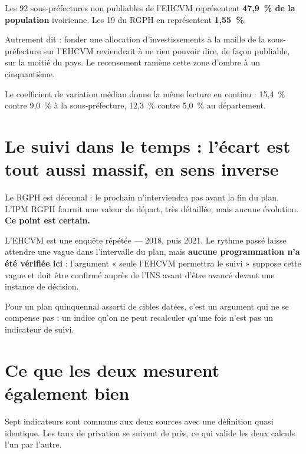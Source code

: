 \documentclass[11pt,a4paper]{article}
\begin{document}
\begin{attention}
Les 92 sous-préfectures non publiables de l'EHCVM représentent \textbf{47,9~\% de la population}
ivoirienne. Les 19 du RGPH en représentent \textbf{1,55~\%}.

Autrement dit : fonder une allocation d'investissements à la maille de la sous-préfecture sur
l'EHCVM reviendrait à ne rien pouvoir dire, de façon publiable, sur la moitié du pays. Le
recensement ramène cette zone d'ombre à un cinquantième.
\end{attention}

Le coefficient de variation médian donne la même lecture en continu : 15,4~\% contre 9,0~\% à la
sous-préfecture, 12,3~\% contre 5,0~\% au département.

\section{Le suivi dans le temps : l'écart est tout aussi massif, en sens inverse}

\begin{attention}
Le RGPH est décennal : le prochain n'interviendra pas avant la fin du plan. L'IPM RGPH fournit une
valeur de départ, très détaillée, mais aucune évolution. \textbf{Ce point est certain.}

L'EHCVM est une enquête répétée --- 2018, puis 2021. Le rythme passé laisse attendre une vague dans
l'intervalle du plan, mais \textbf{aucune programmation n'a été vérifiée ici} : l'argument « seule
l'EHCVM permettra le suivi » suppose cette vague et doit être confirmé auprès de l'INS avant d'être
avancé devant une instance de décision.
\end{attention}

Pour un plan quinquennal assorti de cibles datées, c'est un argument qui ne se compense pas : un
indice qu'on ne peut recalculer qu'une fois n'est pas un indicateur de suivi.

\section{Ce que les deux mesurent également bien}

Sept indicateurs sont communs aux deux sources avec une définition quasi identique. Les taux de
privation se suivent de près, ce qui valide les deux calculs l'un par l'autre.
\end{document}
